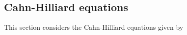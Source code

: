 \documentclass{article}
\theoremstyle{plain}
\theoremstyle{definition}
\numberwithin{theorem}{section}
\begin{document}
%
%
%


\subsection{Cahn-Hilliard equations}

This section considers the Cahn-Hilliard equations given by
\end{document}
